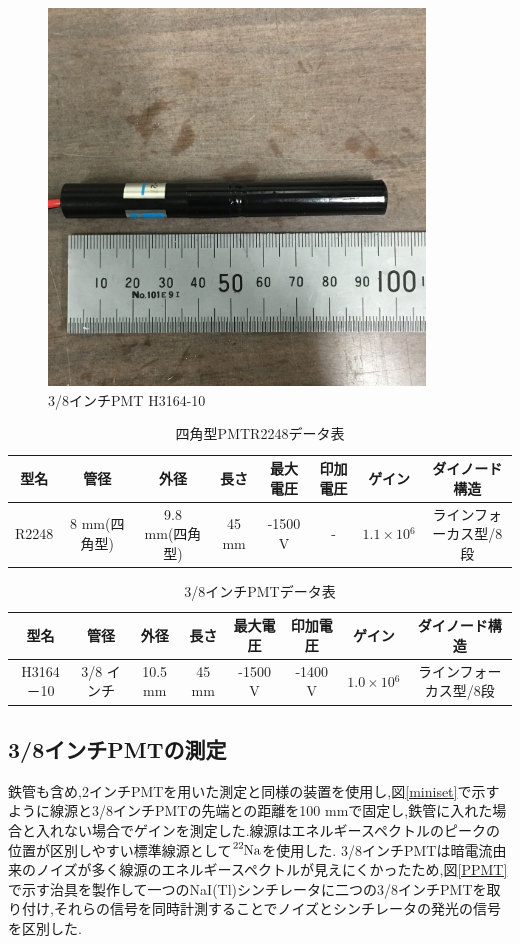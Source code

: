 \begin{figure}[tbp]
	\centering
		\includegraphics[width=10cm]{fig/iguchi/miniPMT.jpg}
	\caption{3/8インチPMT H3164-10}
	\label{3/8inch}
\end{figure}


\begin{table}[tbp]
	\centering
	  \begin{tabular}{cccccccc} \hline
		型名& 管径 & 外径 & 長さ & 最大電圧 & 印加電圧 & ゲイン & ダイノード構造 \\ \hline \hline
		R2248 & 8 mm(四角型) & 9.8 mm(四角型)& 45 mm & -1500 V & - & $1.1\times10{^{6}}$ &ラインフォーカス型/8段 \\ \hline
	\end{tabular}
	  \caption{四角型PMT\hspace{3pt}R2248データ表}
	  \label{R2248data}
\end{table}

\begin{table}[tbp]
	\centering
	
	  \begin{tabular}{cccccccc} \hline
		型名& 管径 & 外径 & 長さ & 最大電圧 & 印加電圧 & ゲイン & ダイノード構造 \\ \hline \hline
		H3164－10 & 3/8 インチ & 10.5 mm & 45 mm & -1500 V & -1400 V & $1.0\times10{^{6}}$ &ラインフォーカス型/8段　\\ \hline
	\end{tabular}
	  \caption{3/8インチPMTデータ表}
	  \label{3/8inchPMT}
\end{table}

\subsection{3/8インチPMTの測定}
鉄管も含め,2インチPMTを用いた測定と同様の装置を使用し,図\ref{miniset}で示すように線源と3/8インチPMTの先端との距離を100 mmで固定し,鉄管に入れた場合と入れない場合でゲインを測定した.線源はエネルギースペクトルのピークの位置が区別しやすい標準線源として$\ce{^{22}Na}$を使用した.
3/8インチPMTは暗電流由来のノイズが多く線源のエネルギースペクトルが見えにくかったため,図\ref{PPMT}で示す治具を製作して一つのNaI(Tl)シンチレータに二つの3/8インチPMTを取り付け,それらの信号を同時計測することでノイズとシンチレータの発光の信号を区別した.

